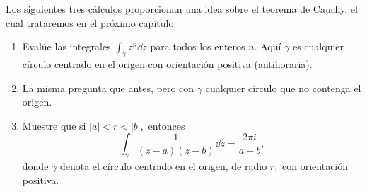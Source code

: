 \setcounter{eje}{24}
\begin{ejer}
Los siguientes tres cálculos proporcionan una idea sobre el teorema de Cauchy, el cual trataremos en el próximo capítulo.
\begin{enumerate}[label=(\alph*), leftmargin=1.8em]
\item Evalúe las integrales $\int_\gamma z^n \dd{z}$ para todos los enteros $n$. Aquí $\gamma$ es cualquier círculo centrado en el origen con orientación positiva (antihoraria).
\item La misma pregunta que antes, pero con $\gamma$ cualquier círculo que no contenga el origen.
\item Muestre que si $|a| < r < |b|,$ entonces
\[ 
\int_\gamma \frac{1}{(z-a)(z-b)} \dd{z} = \frac{2\pi i}{a-b}, 
\]
donde $\gamma$ denota el círculo centrado en el origen, de radio $r,$ con orientación positiva.
\end{enumerate}
\end{ejer}
